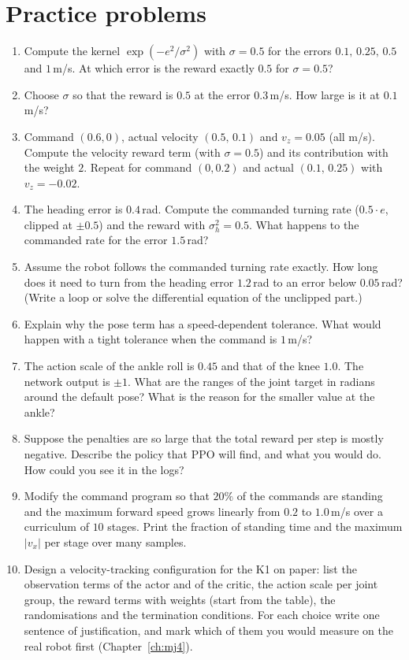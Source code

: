 \section*{Practice problems}
\begin{enumerate}[label=\textbf{\thechapter.\arabic*}]
  \item Compute the kernel $\exp(-e^2/\sigma^2)$ with $\sigma=0.5$ for the errors $0.1,\,0.25,\,0.5$ and $1$\,m/s. At which error is the reward exactly $0.5$ for $\sigma=0.5$?
  \item Choose $\sigma$ so that the reward is $0.5$ at the error $0.3$\,m/s. How large is it at $0.1$\,m/s?
  \item Command $(0.6,0)$, actual velocity $(0.5,\,0.1)$ and $v_z=0.05$ (all m/s). Compute the velocity reward term (with $\sigma=0.5$) and its contribution with the weight $2$. Repeat for command $(0,0.2)$ and actual $(0.1,\,0.25)$ with $v_z=-0.02$.
  \item The heading error is $0.4$\,rad. Compute the commanded turning rate ($0.5\cdot e$, clipped at $\pm0.5$) and the reward with $\sigma_h^2=0.5$. What happens to the commanded rate for the error $1.5$\,rad?
  \item Assume the robot follows the commanded turning rate exactly. How long does it need to turn from the heading error $1.2$\,rad to an error below $0.05$\,rad? (Write a loop or solve the differential equation of the unclipped part.)
  \item Explain why the pose term has a speed-dependent tolerance. What would happen with a tight tolerance when the command is $1$\,m/s?
  \item The action scale of the ankle roll is $0.45$ and that of the knee $1.0$. The network output is $\pm1$. What are the ranges of the joint target in radians around the default pose? What is the reason for the smaller value at the ankle?
  \item Suppose the penalties are so large that the total reward per step is mostly negative. Describe the policy that PPO will find, and what you would do. How could you see it in the logs?
  \item Modify the command program so that $20\%$ of the commands are standing and the maximum forward speed grows linearly from $0.2$ to $1.0$\,m/s over a curriculum of $10$ stages. Print the fraction of standing time and the maximum $|v_x|$ per stage over many samples.
  \item[\textbf{\thechapter.10}$\star$] Design a velocity-tracking configuration for the K1 on paper: list the observation terms of the actor and of the critic, the action scale per joint group, the reward terms with weights (start from the table), the randomisations and the termination conditions. For each choice write one sentence of justification, and mark which of them you would measure on the real robot first (Chapter~\ref{ch:mj4}).
\end{enumerate}
